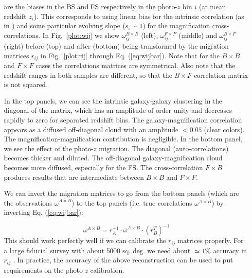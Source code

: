 are the biases in the BS and FS respectively in the photo-$z$ bin $i$ (at mean redshift $z_i$). This corresponds
to using linear bias for the intrinsic  correlation (as in \citet{Gaztanaga2012}) and some particular evolving
slope ($s_i \sim 1$) for the magnification cross-correlations.
 In Fig.~\ref{plot:wij} we show $\omega^{B\times B}_{ij}$ (left), $\omega^{F\times F}_{ij}$ (middle) and $\omega^{B\times F}_{ij}$ (right) before (top) and after (bottom) being transformed by the migration matrices $r_{ij}$ in Fig.~\ref{plot:rij} through Eq. (\ref{eq:wijbar}). Note that for the $B\times B$ and $F \times F$ cases the correlations matrices are symmetrical. Also note that the redshift ranges in both samples are different, so that the $B \times F$ correlation matrix is not squared.

 In the top panels, we can see the
intrinsic galaxy-galaxy clustering in the diagonal of the matrix, which has an amplitude of order unity and
decreases rapidly to zero for separated redshift bins. 
The galaxy-magnification correlation appears as a diffused off-diagonal cloud with an 
amplitude $<0.05$ (clear colors). The magnification-magnification contribution is negligible.
In the bottom panel, we see the effect of the photo-$z$ migration. The diagonal
(auto-correlations) becomes thicker and diluted. The off-diagonal galaxy-magnification cloud becomes
 more diffused, especially for the FS. The cross-correlation $F \times B$ produces results that are intermediate
between $B \times B$ and $F \times F$.

We can invert the migration matrices to go from the bottom
panels (which are the observations $\bar{\omega}^{A\times B}$) to the top panels (i.e. true correlations
$\omega^{A \times B}$) by inverting Eq. (\ref{eq:wijbar}):

\begin{equation}
 \omega^{A \times B} = r_A^{-1} \cdot \bar{\omega}^{A\times B}  \cdot  (r^T_B)^{-1} 
\label{eq:wij}
\end{equation}
This should work perfectly well if we can calibrate the $r_{ij}$ matrices properly. For a large
fiducial survey with about 5000 sq. deg. we need about $\simeq 1\%$ accuracy in $r_{ij}$
\citep{Gaztanaga2012}. In practice, the accuracy of the above reconstruction
 can be used to put requirements on the photo-$z$ calibration.
